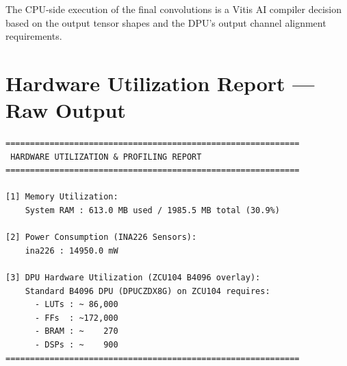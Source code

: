 \documentclass[12pt, a4paper]{report}
\begin{document}
The CPU-side execution of the final convolutions is a Vitis AI compiler decision based on the output tensor shapes and the DPU's output channel alignment requirements.


\chapter{Hardware Utilization Report --- Raw Output}

\begin{lstlisting}[caption={Complete hardware report from ZCU104 during Complex-YOLOv4 inference}]
============================================================
 HARDWARE UTILIZATION & PROFILING REPORT
============================================================

[1] Memory Utilization:
    System RAM : 613.0 MB used / 1985.5 MB total (30.9%)

[2] Power Consumption (INA226 Sensors):
    ina226 : 14950.0 mW

[3] DPU Hardware Utilization (ZCU104 B4096 overlay):
    Standard B4096 DPU (DPUCZDX8G) on ZCU104 requires:
      - LUTs : ~ 86,000
      - FFs  : ~172,000
      - BRAM : ~    270
      - DSPs : ~    900
============================================================
\end{lstlisting}
\end{document}
